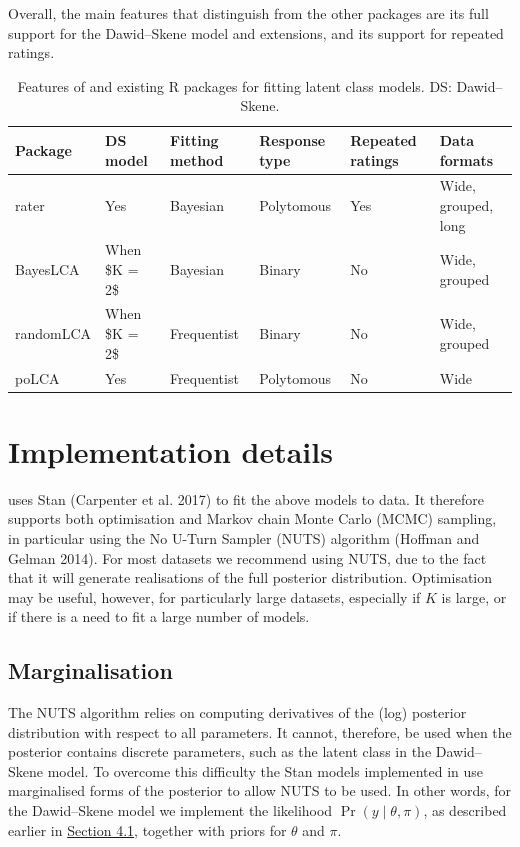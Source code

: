 Overall, the main features that distinguish  from the other
packages are its full support for the Dawid--Skene model and extensions,
and its support for repeated ratings.

\begin{table}

\caption{\label{tab:package-features}Features of
   and existing R
  packages for fitting latent class models. DS: Dawid--Skene.}
\centering
\begin{tabular}[t]{l|l|l|l|l|l}
\hline
Package & DS model & Fitting method & Response type & Repeated ratings & Data formats\\
\hline
rater & Yes & Bayesian & Polytomous & Yes & Wide, grouped, long\\
\hline
BayesLCA & When \$K = 2\$ & Bayesian & Binary & No & Wide, grouped\\
\hline
randomLCA & When \$K = 2\$ & Frequentist & Binary & No & Wide, grouped\\
\hline
poLCA & Yes & Frequentist & Polytomous & No & Wide\\
\hline
\end{tabular}
\end{table}

\hypertarget{sec:implementation}{%
\section{Implementation details}\label{sec:implementation}}

 uses Stan (Carpenter et al. 2017) to fit the above models to data.
It therefore supports
both optimisation and Markov chain Monte Carlo (MCMC) sampling, in
particular using the No U-Turn Sampler (NUTS) algorithm
(Hoffman and Gelman 2014). For most datasets we recommend using NUTS, due
to the fact that it will generate realisations of the full posterior
distribution. Optimisation may be useful, however, for particularly
large datasets, especially if \(K\) is large, or if there is a need to fit
a large number of models.

\hypertarget{sec:marginalisation}{%
\subsection{Marginalisation}\label{sec:marginalisation}}

The NUTS algorithm relies on computing derivatives of the (log)
posterior distribution with respect to all parameters. It cannot,
therefore, be used when the posterior contains discrete parameters, such
as the latent class in the Dawid--Skene model. To overcome this
difficulty the Stan models implemented in
 use marginalised
forms of the posterior to allow NUTS to be used. In other words, for the
Dawid--Skene model we implement the likelihood
\(\Pr(y \mid \theta, \pi)\), as described earlier in
\protect\hyperlink{sec:dawid-skene}{Section 4.1}, together with priors for \(\theta\) and \(\pi\).

